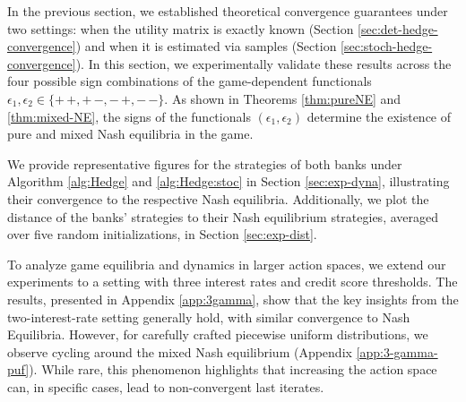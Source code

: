 In the previous section, we established theoretical convergence guarantees under two settings: when the utility matrix is exactly known (Section \ref{sec:det-hedge-convergence}) and when it is estimated via samples (Section \ref{sec:stoch-hedge-convergence}). In this section, we experimentally validate these results across the four possible sign combinations of the game-dependent functionals \(\epsilon_1, \epsilon_2 \in \{+\,+, +\,-, -\,+, -\,-\}\). As shown in Theorems \ref{thm:pureNE} and \ref{thm:mixed-NE}, the signs of the functionals $(\epsilon_1,\epsilon_2)$ determine the existence of pure and mixed Nash equilibria in the game.  

We provide representative figures for the strategies of both banks under Algorithm \ref{alg:Hedge} and \ref{alg:Hedge:stoc} in Section \ref{sec:exp-dyna}, illustrating their convergence to the respective Nash equilibria. Additionally, we plot the distance of the banks' strategies to their Nash equilibrium strategies, averaged over five random initializations, in Section \ref{sec:exp-dist}. 

To analyze game equilibria and dynamics in larger action spaces, we extend our experiments to a setting with three interest rates and credit score thresholds. The results, presented in Appendix \ref{app:3gamma}, show that the key insights from the two-interest-rate setting generally hold, with similar convergence to Nash Equilibria. However, for carefully crafted piecewise uniform distributions, we observe cycling around the mixed Nash equilibrium (Appendix \ref{app:3-gamma-puf}). While rare, this phenomenon highlights that increasing the action space can, in specific cases, lead to non-convergent last iterates. 









